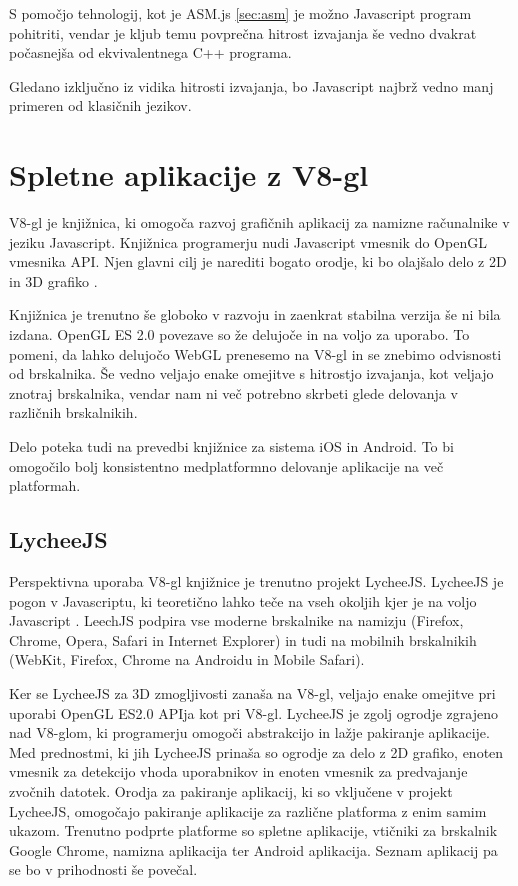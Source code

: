 S pomočjo tehnologij, kot je ASM.js \ref{sec:asm} je možno Javascript program pohitriti, vendar je kljub temu povprečna hitrost izvajanja še vedno dvakrat počasnejša od ekvivalentnega C++ programa.

Gledano izključno iz vidika hitrosti izvajanja, bo Javascript najbrž vedno manj primeren od klasičnih jezikov.

\section{Spletne aplikacije z V8-gl}

V8-gl je knjižnica, ki omogoča razvoj grafičnih aplikacij za namizne računalnike v jeziku Javascript. Knjižnica programerju nudi Javascript vmesnik do OpenGL vmesnika API. Njen glavni cilj je narediti bogato orodje, ki bo olajšalo delo z 2D in 3D grafiko \cite{v8gl}.

Knjižnica je trenutno še globoko v razvoju in zaenkrat stabilna verzija še ni bila izdana. OpenGL ES 2.0 povezave so že delujoče in na voljo za uporabo. To pomeni, da lahko delujočo WebGL prenesemo na V8-gl in se znebimo odvisnosti od brskalnika. Še vedno veljajo enake omejitve s hitrostjo izvajanja, kot veljajo znotraj brskalnika, vendar nam ni več potrebno skrbeti glede delovanja v različnih brskalnikih.

Delo poteka tudi na prevedbi knjižnice za sistema iOS in Android. To bi omogočilo bolj konsistentno medplatformno delovanje aplikacije na več platformah.

\subsection{LycheeJS}

Perspektivna uporaba V8-gl knjižnice je trenutno projekt LycheeJS. LycheeJS je pogon v Javascriptu, ki teoretično lahko teče na vseh okoljih kjer je na voljo Javascript  \cite{lycheejs}. LeechJS podpira vse moderne brskalnike na namizju (Firefox, Chrome, Opera, Safari in Internet Explorer) in tudi na mobilnih brskalnikih (WebKit, Firefox, Chrome na Androidu in Mobile Safari). 

Ker se LycheeJS za 3D zmogljivosti zanaša na V8-gl, veljajo enake omejitve pri uporabi OpenGL ES2.0 APIja kot pri V8-gl. LycheeJS je zgolj ogrodje zgrajeno nad V8-glom, ki programerju omogoči abstrakcijo in lažje pakiranje aplikacije. Med prednostmi, ki jih LycheeJS prinaša so ogrodje za delo z 2D grafiko, enoten vmesnik za detekcijo vhoda uporabnikov in enoten vmesnik za predvajanje zvočnih datotek. Orodja za pakiranje aplikacij, ki so vključene v projekt LycheeJS, omogočajo pakiranje aplikacije za različne platforma z enim samim ukazom. Trenutno podprte platforme so spletne aplikacije, vtičniki za brskalnik Google Chrome, namizna aplikacija ter Android aplikacija. Seznam aplikacij pa se bo v prihodnosti še povečal.

